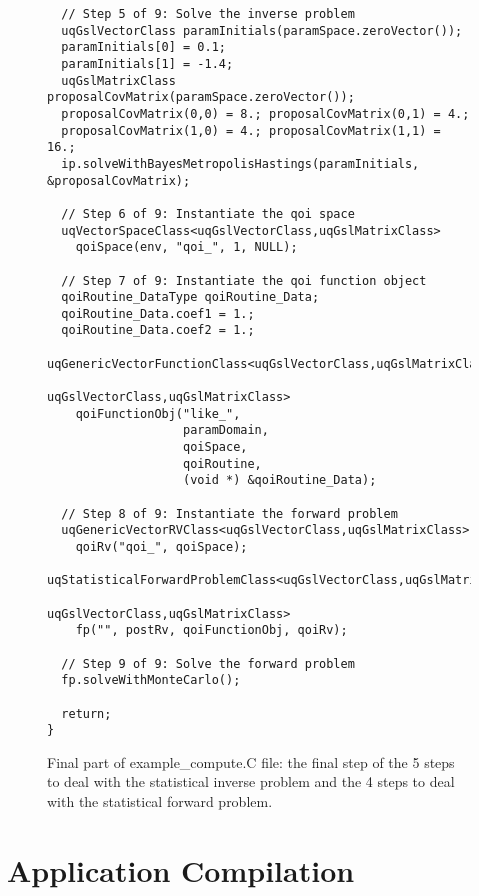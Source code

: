 \begin{figure}[h!]
\begin{center}
\begin{verbatim}
  // Step 5 of 9: Solve the inverse problem
  uqGslVectorClass paramInitials(paramSpace.zeroVector());
  paramInitials[0] = 0.1;
  paramInitials[1] = -1.4;
  uqGslMatrixClass proposalCovMatrix(paramSpace.zeroVector());
  proposalCovMatrix(0,0) = 8.; proposalCovMatrix(0,1) = 4.;
  proposalCovMatrix(1,0) = 4.; proposalCovMatrix(1,1) = 16.;
  ip.solveWithBayesMetropolisHastings(paramInitials, &proposalCovMatrix);

  // Step 6 of 9: Instantiate the qoi space
  uqVectorSpaceClass<uqGslVectorClass,uqGslMatrixClass>
    qoiSpace(env, "qoi_", 1, NULL);

  // Step 7 of 9: Instantiate the qoi function object
  qoiRoutine_DataType qoiRoutine_Data;
  qoiRoutine_Data.coef1 = 1.;
  qoiRoutine_Data.coef2 = 1.;
  uqGenericVectorFunctionClass<uqGslVectorClass,uqGslMatrixClass,
                               uqGslVectorClass,uqGslMatrixClass>
    qoiFunctionObj("like_",
                   paramDomain,
                   qoiSpace,
                   qoiRoutine,
                   (void *) &qoiRoutine_Data);

  // Step 8 of 9: Instantiate the forward problem
  uqGenericVectorRVClass<uqGslVectorClass,uqGslMatrixClass>
    qoiRv("qoi_", qoiSpace);
  uqStatisticalForwardProblemClass<uqGslVectorClass,uqGslMatrixClass,
                                   uqGslVectorClass,uqGslMatrixClass>
    fp("", postRv, qoiFunctionObj, qoiRv);

  // Step 9 of 9: Solve the forward problem
  fp.solveWithMonteCarlo();

  return;
}
\end{verbatim}
\end{center}
\caption{
Final part of example\_compute.C file: the final step of the 5 steps to deal with the statistical inverse problem and the 4 steps to deal with the statistical forward problem.
}
\label{fig-compute-c2}
\end{figure}

\clearpage
\section{Application Compilation}


